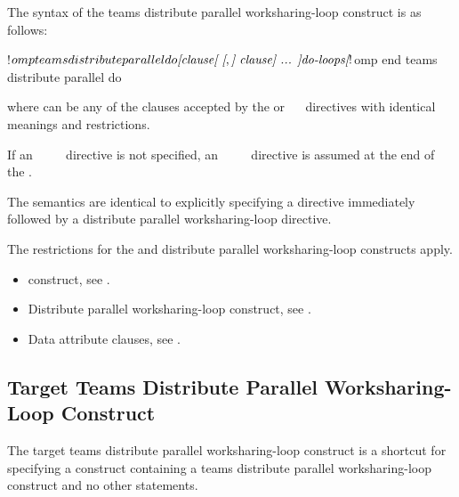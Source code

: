 \begin{fortranspecific}
The syntax of the teams distribute parallel worksharing-loop construct is as follows:

\begin{ompfPragma}
!$omp teams distribute parallel do \plc{[clause[ [},\plc{] clause] ... ]}
   \plc{do-loops}
\plc{[} !$omp end teams distribute parallel do \plc{]}
\end{ompfPragma}

where  can be any of the clauses accepted by the  or
~~ directives with identical meanings and restrictions.

If an ~~~~ directive is not specified, an
~~~~ directive is assumed at the end of the .
\end{fortranspecific}

\descr
The semantics are identical to explicitly specifying a  directive immediately
followed by a distribute parallel worksharing-loop directive.

\restrictions
The restrictions for the  and distribute parallel worksharing-loop constructs apply.

\crossreferences
\begin{itemize}
\item {} construct, see
.

\item Distribute parallel worksharing-loop construct, see
.

\item Data attribute clauses, see
.
\end{itemize}









\subsection{Target Teams Distribute Parallel Worksharing-Loop Construct}
\label{subsec:Target Teams Distribute Parallel Worksharing-Loop Construct}
\summary
The target teams distribute parallel worksharing-loop construct is a shortcut for specifying a 
construct containing a teams distribute parallel worksharing-loop construct and no other statements.

